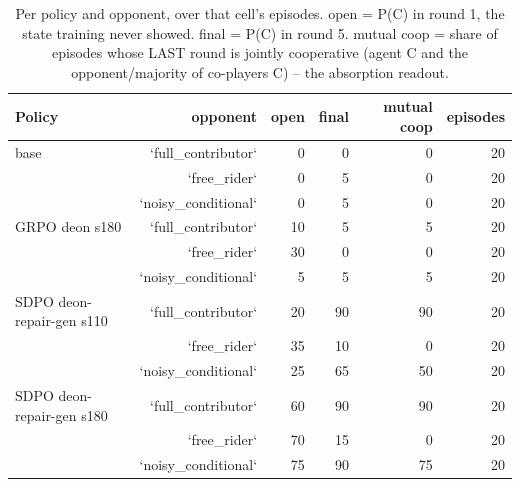 \begin{table}[t]
\centering
\caption{Per policy and opponent, over that cell's episodes. open = P(C) in round 1, the state training never showed. final = P(C) in round 5. mutual coop = share of episodes whose LAST round is jointly cooperative (agent C and the opponent/majority of co-players C) -- the absorption readout.}
\label{tab:mr-outcomes}
\small
\setlength{\tabcolsep}{3.5pt}
\begin{tabular}{lrrrrr}
\toprule
Policy & opponent & open & final & mutual coop & episodes \\
\midrule
base & `full_contributor` & 0 & 0 & 0 & 20 \\
 & `free_rider` & 0 & 5 & 0 & 20 \\
 & `noisy_conditional` & 0 & 5 & 0 & 20 \\
GRPO deon s180 & `full_contributor` & 10 & 5 & 5 & 20 \\
 & `free_rider` & 30 & 0 & 0 & 20 \\
 & `noisy_conditional` & 5 & 5 & 5 & 20 \\
SDPO deon-repair-gen s110 & `full_contributor` & 20 & 90 & 90 & 20 \\
 & `free_rider` & 35 & 10 & 0 & 20 \\
 & `noisy_conditional` & 25 & 65 & 50 & 20 \\
SDPO deon-repair-gen s180 & `full_contributor` & 60 & 90 & 90 & 20 \\
 & `free_rider` & 70 & 15 & 0 & 20 \\
 & `noisy_conditional` & 75 & 90 & 75 & 20 \\
\bottomrule
\end{tabular}
\end{table}
